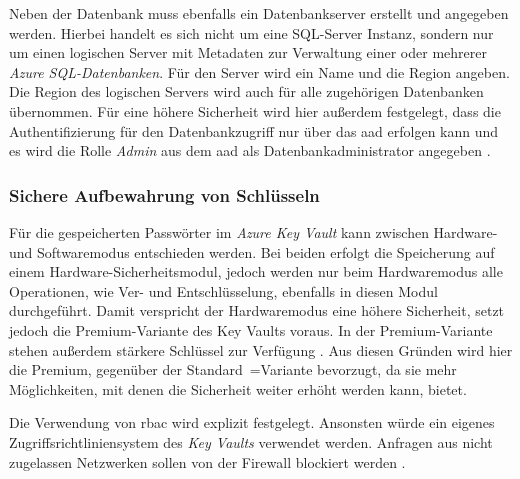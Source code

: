 Neben der Datenbank muss ebenfalls ein Datenbankserver erstellt und angegeben werden. Hierbei handelt es sich nicht um eine SQL-Server Instanz, sondern nur um einen logischen Server mit Metadaten zur Verwaltung einer oder mehrerer \textit{Azure SQL-Datenbanken}. Für den Server wird ein Name und die Region angeben. Die Region des logischen Servers wird auch für alle zugehörigen Datenbanken übernommen. Für eine höhere Sicherheit wird hier außerdem festgelegt, dass die Authentifizierung für den Datenbankzugriff nur über das \ac{aad} erfolgen kann und es wird die Rolle \textit{Admin} aus dem \ac{aad} als Datenbankadministrator angegeben  \cite[vgl.][]{ward_azure_2021}.

\subsubsection{Sichere Aufbewahrung von Schlüsseln} \label{subsec:infra:konfig:keyVault}
Für die gespeicherten Passwörter im \textit{Azure Key Vault} kann zwischen Hardware- und Softwaremodus entschieden werden. Bei beiden erfolgt die Speicherung auf einem Hardware-Sicherheitsmodul, jedoch werden nur beim Hardwaremodus alle Operationen, wie Ver- und Entschlüsselung, ebenfalls in diesen Modul durchgeführt. Damit verspricht der Hardwaremodus eine höhere Sicherheit, setzt jedoch die Premium-Variante des Key Vaults voraus. In der Premium-Variante stehen außerdem stärkere Schlüssel zur Verfügung \cite{haunts_key_2019}. Aus diesen Gründen wird hier die Premium, gegenüber der Standard~=Variante bevorzugt, da sie mehr Möglichkeiten, mit denen die Sicherheit weiter erhöht werden kann, bietet.

Die Verwendung von \ac{rbac} wird explizit festgelegt. Ansonsten würde ein eigenes Zugriffsrichtliniensystem des \textit{Key Vaults} verwendet werden. Anfragen aus nicht zugelassen Netzwerken sollen von der Firewall blockiert werden \cite[vgl.][]{herath_azure_2022}.


